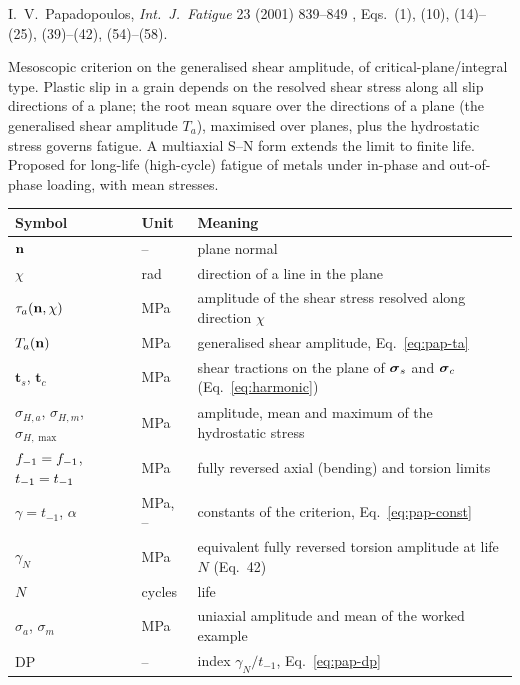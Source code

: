 \label{sheet:PAPADOPOULOS}

 I.~V.~Papadopoulos, \emph{Int.\ J.\ Fatigue} 23 (2001) 839--849
\cite{papadopoulos2001}, Eqs.~(1), (10), (14)--(25), (39)--(42), (54)--(58).

 Mesoscopic criterion on the generalised shear amplitude, of
critical-plane/integral type. Plastic slip in a grain depends on the resolved shear stress along
all slip directions of a plane; the root mean square over the directions of a plane (the
generalised shear amplitude $T_a$), maximised over planes, plus the hydrostatic stress governs
fatigue. A multiaxial S--N form extends the limit to finite life. Proposed for long-life
(high-cycle) fatigue of metals under in-phase and out-of-phase loading, with mean stresses.

\begin{center}\small
\begin{tabular}{@{}llp{100mm}@{}}
\toprule
Symbol & Unit & Meaning\\\midrule
$\mathbf n$ & -- & plane normal\\
$\chi$ & rad & direction of a line in the plane\\
$\tau_a(\mathbf n,\chi)$ & MPa & amplitude of the shear stress resolved along direction $\chi$\\
$T_a(\mathbf n)$ & MPa & generalised shear amplitude, Eq.~\eqref{eq:pap-ta}\\
$\mathbf t_s$, $\mathbf t_c$ & MPa & shear tractions on the plane of $\boldsymbol\sigma_s$ and $\boldsymbol\sigma_c$ (Eq.~\eqref{eq:harmonic})\\
$\sigma_{H,a}$, $\sigma_{H,m}$, $\sigma_{H,\max}$ & MPa & amplitude, mean and maximum of the hydrostatic stress\\
$f_{-1}=f_{-1}$, $t_{-1}=t_{-1}$ & MPa & fully reversed axial (bending) and torsion limits\\
$\gamma=t_{-1}$, $\alpha$ & MPa, -- & constants of the criterion, Eq.~\eqref{eq:pap-const}\\
$\gamma_N$ & MPa & equivalent fully reversed torsion amplitude at life $N$ (Eq.~42)\\
$N$ & cycles & life\\
$\sigma_a$, $\sigma_m$ & MPa & uniaxial amplitude and mean of the worked example\\
$\mathrm{DP}$ & -- & index $\gamma_N/t_{-1}$, Eq.~\eqref{eq:pap-dp}\\
\bottomrule
\end{tabular}
\end{center}

